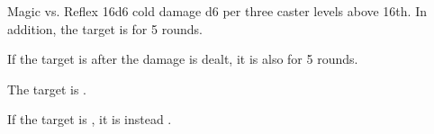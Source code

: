\begin{spellheader}
    \spellrng{\rngclose}
    \begin{spelltargetinginfo}
    \end{spelltargetinginfo}
    \begin{spelleffects}
    \end{spelleffects}
\end{spellheader}
\begin{spellcontent}
    \begin{spellattack}{Magic vs. Reflex}
        \spellsuccess 16d6 cold damage \add d6 per three caster levels above 16th. In addition, the target is \slowed for 5 rounds.

        If the target is \bloodied after the damage is dealt, it is also \paralyzed for 5 rounds.
    \end{spellattack}
\end{spellcontent}
\begin{spellfooter}

\end{spellfooter}

\begin{spellheader}
    \spellrng{\rngclose}
    \begin{spelltargetinginfo}
    \end{spelltargetinginfo}
    \begin{spelleffects}
    \end{spelleffects}
\end{spellheader}
\begin{spellcontent}
    \spelleffect The target is \sickened.

    If the target is \bloodied, it is instead \blinded.
    \spelldur{\durshort}
\end{spellcontent}
\begin{spellfooter}

\end{spellfooter}

